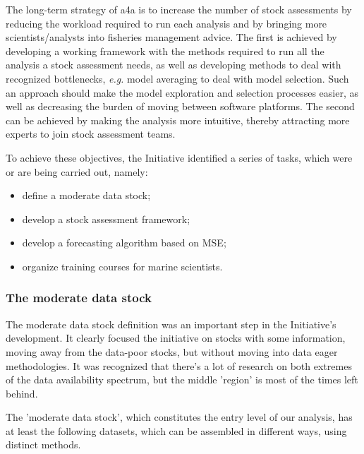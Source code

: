 \documentclass[a4paper,english,10pt]{article}\usepackage[]{graphicx}\usepackage[]{color}
\begin{document}
The long-term strategy of a4a is to increase the number of stock assessments by reducing the workload required to run each analysis and by bringing more scientists/analysts into fisheries management advice. The first is achieved by developing a working framework with the methods required to run all the analysis a stock assessment needs, as well as developing methods to deal with recognized bottlenecks, \emph{e.g.} model averaging to deal with model selection. Such an approach should make the model exploration and selection processes easier, as well as decreasing the burden of moving between software platforms. The second can be achieved by making the analysis more intuitive, thereby attracting more experts to join stock assessment teams.

To achieve these objectives, the Initiative identified a series of tasks, which were or are being carried out, namely:
\begin{itemize}
	\item define a moderate data stock;
	\item develop a stock assessment framework;
	\item develop a forecasting algorithm based on MSE;
	\item organize training courses for marine scientists.
\end{itemize}

\subsubsection{The moderate data stock}

The moderate data stock definition was an important step in the Initiative's development. It clearly focused the initiative on stocks with some information, moving away from the data-poor stocks, but without moving into data eager methodologies. It was recognized that there's a lot of research on both extremes of the data availability spectrum, but the middle 'region' is most of the times left behind.

The 'moderate data stock', which constitutes the entry level of our analysis, has at least the following datasets, which can be assembled in different ways, using distinct methods.
 
\end{document}
